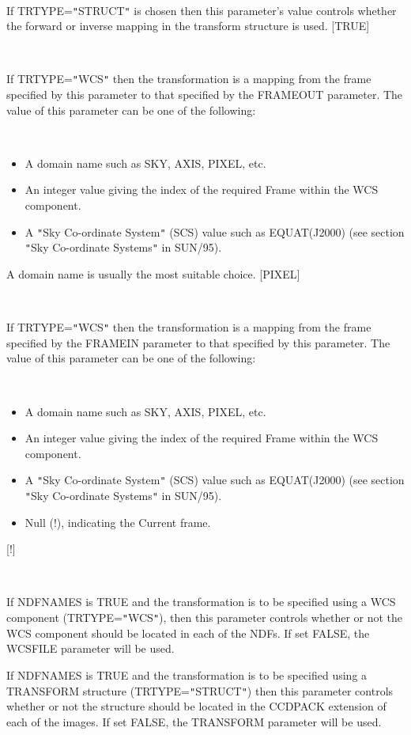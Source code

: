 \documentclass[twoside,11pt]{article}
\newcommand{\xref}[3]{#1}
\renewcommand{\_}{\texttt{\symbol{95}}}
\newcommand{\qt}[1]{{\tt "}#1{\tt "}}
\newcommand{\sstsubsection}[1]{ \item[{#1}] \mbox{} \\}
\newcommand{\sstitemlist}[1]{
  \mbox{} \\
  \vspace{-3.5ex}
  \begin{itemize}
     #1
  \end{itemize}
}
\newcommand{\sstitem}{\item}
\newcommand{\sstsubsection}[1]{\item[{#1}]}
\newcommand{\sstitemlist}[1]{
      \begin{itemize}
         #1
      \end{itemize}
      \\
   }
\newcommand{\sstitem}{\item}
\begin{document}
{{{      }
      \sstsubsection{
         FORWARD = \_LOGICAL (Read)
      }{
         If TRTYPE=\qt{STRUCT} is chosen then this parameter's value
         controls whether the forward or inverse mapping in the
         transform structure is used.
         [TRUE]
      }
      \sstsubsection{
         FRAMEIN = LITERAL (Read)
      } {
         If TRTYPE=\qt{WCS} then the transformation is a mapping from the
         frame specified by this parameter to that specified by the
         FRAMEOUT parameter.  The value of this parameter can be one of
         the following:
         \sstitemlist{
            \sstitem
               A domain name such as SKY, AXIS, PIXEL, etc.
            \sstitem
               An integer value giving the index of the required Frame
               within the WCS component.
            \sstitem
               A \qt{Sky Co-ordinate System} (SCS) value such as
               EQUAT(J2000)
               (see section
               \xref{\qt{Sky Co-ordinate Systems}}{sun95}{se_scs} in
               SUN/95).
         }
         A domain name is usually the most suitable choice.
         [PIXEL]
      }
      \sstsubsection{
         FRAMEOUT = LITERAL (Read)
      } {
         If TRTYPE=\qt{WCS} then the transformation is a mapping from the
         frame specified by the FRAMEIN parameter to that specified
         by this parameter.  The value of this parameter can be one of
         the following:
         \sstitemlist{
            \sstitem
               A domain name such as SKY, AXIS, PIXEL, etc.
            \sstitem
               An integer value giving the index of the required Frame
               within the WCS component.
            \sstitem
               A \qt{Sky Co-ordinate System} (SCS) value such as
               EQUAT(J2000)
               (see section
               \xref{\qt{Sky Co-ordinate Systems}}{sun95}{se_scs} in
               SUN/95).
            \sstitem
               Null (!), indicating the Current frame.
         }
         [!]
      }
      \sstsubsection{
         INEXT = \_LOGICAL (Read)
      }{
         If NDFNAMES is TRUE and the transformation is to be specified
         using a WCS component (TRTYPE=\qt{WCS}), then this parameter
         controls whether or not the WCS component should be located
         in each of the NDFs.  If set FALSE, the WCSFILE parameter will
         be used.

         If NDFNAMES is TRUE and the transformation is to be specified
         using a TRANSFORM structure (TRTYPE=\qt{STRUCT}) then this
         parameter controls whether or not the structure should be
         located in the CCDPACK extension of each of the images.  If
         set FALSE, the TRANSFORM parameter will be used.

}}}
\end{document}
